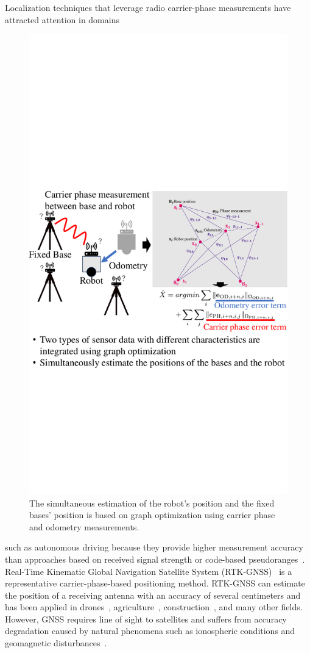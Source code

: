 \documentclass[conference]{IEEEtran}
\begin{document}
Localization techniques that leverage radio carrier-phase measurements have attracted attention in domains 
\begin{figure}[H]
    \centering
    \includegraphics[width=0.99\linewidth]{figures/Fig1.pdf}
    \caption{The simultaneous estimation of the robot's position and the fixed bases' position is based on graph optimization using carrier phase and odometry measurements.}
    \label{fig:fig1}
\end{figure}
such as autonomous driving because they provide higher measurement accuracy than approaches based on received signal strength or code-based pseudoranges~\cite{gnss_autonomou_vehicles}.
Real-Time Kinematic Global Navigation Satellite System (RTK-GNSS)~\cite{RTK-GNSS} is a representative carrier-phase-based positioning method.
RTK-GNSS can estimate the position of a receiving antenna with an accuracy of several centimeters and has been applied in drones~\cite{RTK-M300}, agriculture~\cite{RTK-Agriculture}, construction~\cite{six-dump}, and many other fields.
However, GNSS requires line of sight to satellites and suffers from accuracy degradation caused by natural phenomena such as ionospheric conditions and geomagnetic disturbances~\cite{gnss_error}.
\end{document}
